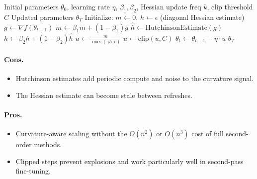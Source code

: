 \begin{algorithm}[H]
\caption{Sophia (Diagonal Hessian with Clipped Updates)}
\label{alg:sophia}
\begin{algorithmic}[1]
\Require Initial parameters $\theta_0$, learning rate $\eta$, $\beta_1, \beta_2$, Hessian update freq $k$, clip threshold $C$
\Ensure Updated parameters $\theta_T$
\State Initialize: $m \gets 0$, $h \gets \epsilon$ (diagonal Hessian estimate)
    \State $g \gets \nabla f(\theta_{t-1})$
    \State $m \gets \beta_1 m + (1-\beta_1) g$ 
        \State $\hat{h} \gets \text{HutchinsonEstimate}(g)$ 
        \State $h \gets \beta_2 h + (1-\beta_2) \hat{h}$ 
    \EndIf
    \State $u \gets \frac{m}{\max(\gamma h, \epsilon)}$ 
    \State $u \gets \text{clip}(u, C)$ 
    \State $\theta_t \gets \theta_{t-1} - \eta \cdot u$
\EndFor
\Return $\theta_T$
\end{algorithmic}
\end{algorithm}

\paragraph{Cons.}
\begin{itemize}[leftmargin=*]
\item Hutchinson estimates add periodic compute and noise to the curvature signal.
\item The Hessian estimate can become stale between refreshes.
\end{itemize}

\paragraph{Pros.}
\begin{itemize}[leftmargin=*]
\item Curvature-aware scaling without the $O(n^2)$ or $O(n^3)$ cost of full second-order methods.
\item Clipped steps prevent explosions and work particularly well in second-pass fine-tuning.
\end{itemize}

